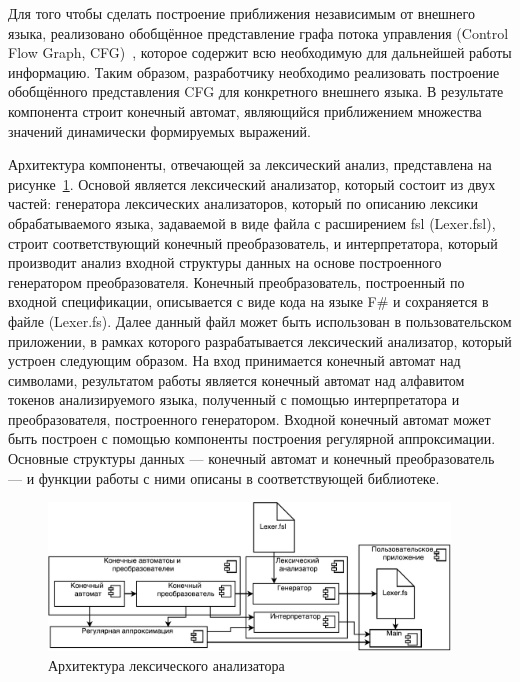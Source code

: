 Для того чтобы сделать построение приближения независимым от внешнего языка, реализовано обобщённое представление графа потока управления (Control Flow Graph, CFG)~\cite{Dragon}, которое содержит всю необходимую для дальнейшей работы информацию. Таким образом, разработчику необходимо реализовать построение обобщённого представления CFG для конкретного внешнего языка. В результате компонента строит конечный автомат, являющийся приближением множества значений динамически формируемых выражений.

Архитектура компоненты, отвечающей за лексический анализ, представлена на рисунке~\ref{fig:LexArch}. Основой является  лексический анализатор, который состоит из двух частей: генератора лексических анализаторов, который по описанию лексики обрабатываемого языка, задаваемой в виде файла с расширением fsl (Lexer.fsl), строит соответствующий конечный преобразователь, и интерпретатора, который производит анализ входной структуры данных на основе построенного генератором преобразователя. Конечный преобразователь, построенный по входной спецификации, описывается с виде кода на языке F\# и сохраняется в файле (Lexer.fs). Далее данный файл может быть использован в пользовательском приложении, в рамках которого разрабатывается лексический анализатор, который устроен следующим образом. На вход принимается конечный автомат над символами, результатом работы является конечный автомат над алфавитом токенов анализируемого языка, полученный с помощью интерпретатора и преобразователя, построенного генератором. Входной конечный автомат может быть построен с помощью компоненты построения регулярной аппроксимации. Основные структуры данных --- конечный автомат и конечный преобразователь --- и функции работы с ними описаны в соответствующей библиотеке.

\begin{figure}[h!]
\begin{center}
\includegraphics[width=0.95\textwidth]{pics/LexerDiagram}
\caption{Архитектура лексического анализатора}
\label{fig:LexArch} 
\end{center}
\end{figure}

